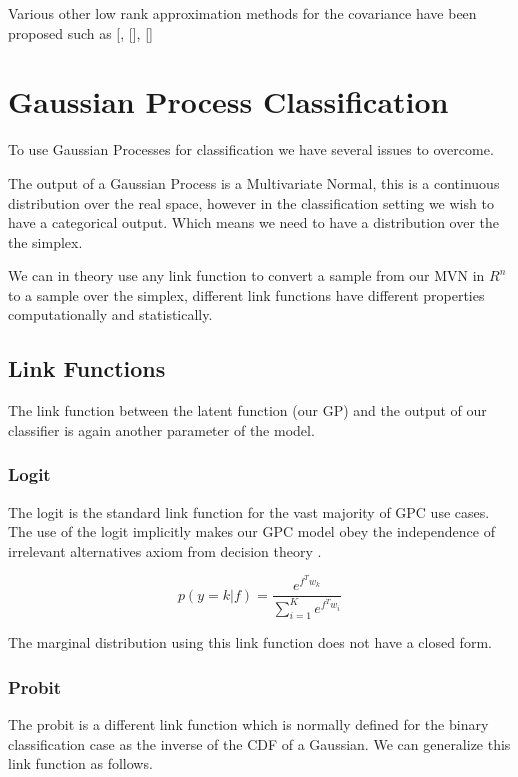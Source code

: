 \documentclass[12pt, a4paper]{report}
\theoremstyle{definition}
\theoremstyle{definition}
\theoremstyle{definition}
\begin{document}
Various other low rank approximation methods for the covariance have been proposed such as [, [], []

\section{Gaussian Process Classification}

To use Gaussian Processes for classification we have several issues to overcome.

The output of a Gaussian Process is a Multivariate Normal, this is a continuous distribution over the real space, however in the classification setting we wish to have a categorical output. Which means we need to have a distribution over the the simplex.

We can in theory use any link function to convert a sample from our MVN in $R^n$ to a sample over the simplex, different link functions have different properties computationally and statistically.

\subsection{Link Functions}

The link function between the latent function (our GP) and the output of our classifier is again another parameter of the model.

\subsubsection{Logit}

The logit is the standard link function for the vast majority of GPC use cases. The use of the logit implicitly makes our GPC model obey the independence of irrelevant alternatives axiom from decision theory \cite{resnet}.


$$p\left( y = k | f\right) = \frac{e^{f^T w_k}}{\sum_{i=1}^{K} e^{f^T w_i}}$$


The marginal distribution using this link function does not have a closed form.


\subsubsection{Probit}

The probit is a different link function which is normally defined for the binary classification case as the inverse of the CDF of a Gaussian. We can generalize this link function as follows.
\end{document}
